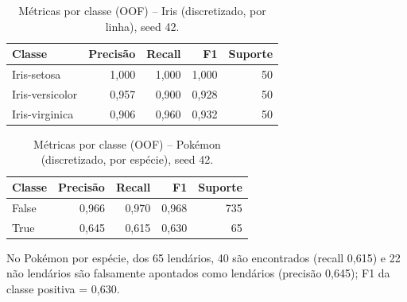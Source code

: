 \documentclass[a4paper,11pt]{article}
\begin{document}
\begin{table}[htbp]
\centering
\small
\caption{Métricas por classe (OOF) -- Iris (discretizado, por linha), seed 42.}
\label{tab:classe_iris_disc}
\begin{tabular}{lrrrr}
\toprule
Classe & Precisão & Recall & F1 & Suporte \\
\midrule
Iris-setosa & 1,000 & 1,000 & 1,000 & 50 \\
Iris-versicolor & 0,957 & 0,900 & 0,928 & 50 \\
Iris-virginica & 0,906 & 0,960 & 0,932 & 50 \\
\bottomrule
\end{tabular}
\end{table}

\begin{table}[htbp]
\centering
\small
\caption{Métricas por classe (OOF) -- Pokémon (discretizado, por espécie), seed 42.}
\label{tab:classe_pokemon_disc_group}
\begin{tabular}{lrrrr}
\toprule
Classe & Precisão & Recall & F1 & Suporte \\
\midrule
False & 0,966 & 0,970 & 0,968 & 735 \\
True & 0,645 & 0,615 & 0,630 & 65 \\
\bottomrule
\end{tabular}
\end{table}


No Pok\'emon por esp\'ecie, dos 65 lend\'arios, 40 s\~ao encontrados (recall 0,615) e 22 n\~ao lend\'arios s\~ao falsamente apontados como lend\'arios (precis\~ao 0,645); F1 da classe positiva = 0,630.
\end{document}
